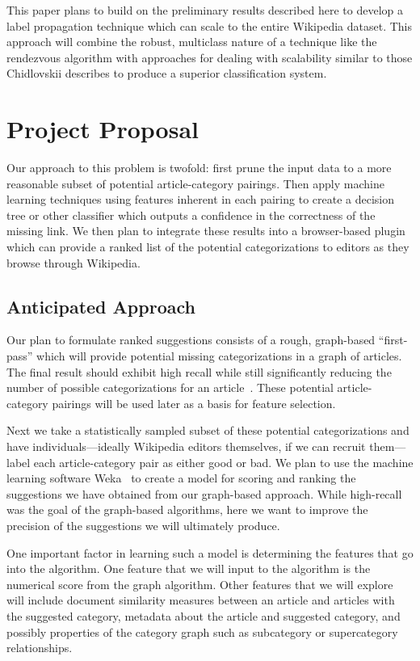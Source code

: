\documentclass{sig-alternate}
\begin{document}
This paper plans to build on the preliminary results described here to develop a label propagation technique which can scale to the entire Wikipedia dataset. This approach will combine the robust, multiclass nature of a technique like the rendezvous algorithm with approaches for dealing with scalability similar to those Chidlovskii describes to produce a superior classification system.

\section{Project Proposal}
\label{sec:project_proposal}
Our approach to this problem is twofold: first prune the input data to a more reasonable subset of potential article-category pairings. Then apply machine learning techniques using features inherent in each pairing to create a decision tree or other classifier which outputs a confidence in the correctness of the missing link. We then plan to integrate these results into a browser-based plugin which can provide a ranked list of the potential categorizations to editors as they browse through Wikipedia.

\subsection{Anticipated Approach}
\label{subsec:approach}
Our plan to formulate ranked suggestions consists of a rough, graph-based ``first-pass'' which will provide potential missing categorizations in a graph of articles. The final result should exhibit high recall while still significantly reducing the number of possible categorizations for an article~\cite{Avrachenkov}. These potential article-category pairings will be used later as a basis for feature selection.

Next we take a statistically sampled subset of these potential categorizations and have individuals---ideally Wikipedia editors themselves, if we can recruit them---label each article-category pair as either good or bad. We plan to use the machine learning software Weka~\cite{Weka} to create a model for scoring and ranking the suggestions we have obtained from our graph-based approach. While high-recall was the goal of the graph-based algorithms, here we want to improve the precision of the suggestions we will ultimately produce. 

One important factor in learning such a model is determining the features that go into the algorithm. One feature that we will input to the algorithm is the numerical score from the graph algorithm. Other features that we will explore will include document similarity measures between an article and articles with the suggested category, metadata about the article and suggested category, and possibly properties of the category graph such as subcategory or supercategory relationships.
\end{document}
